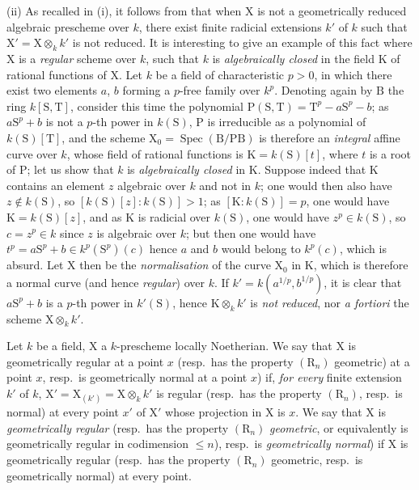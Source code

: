 \begin{remarks}[6.7.5]
(ii) As recalled in (i), it follows from  that when $\mathrm{X}$ is not a geometrically reduced algebraic prescheme over $k$, there exist finite radicial extensions $k'$ of $k$ such that $\mathrm{X}'=\mathrm{X}\otimes_k k'$ is not reduced. It is interesting to give an example of this fact where $\mathrm{X}$ is a \emph{regular} scheme over $k$, such that $k$ is \emph{algebraically closed} in the field $\mathrm{K}$ of rational functions of $\mathrm{X}$. Let $k$ be a field of characteristic $p>0$, in which there exist two elements $a$, $b$ forming a $p$-free family over $k^p$. Denoting again by $\mathrm{B}$ the ring $k[\mathrm{S},\mathrm{T}]$, consider this time the polynomial $\mathrm{P}(\mathrm{S},\mathrm{T})=\mathrm{T}^p-a\mathrm{S}^p-b$; as $a\mathrm{S}^p+b$ is not a $p$-th power in $k(\mathrm{S})$, $\mathrm{P}$ is irreducible as a polynomial of $k(\mathrm{S})[\mathrm{T}]$, and the scheme $\mathrm{X}_0=\operatorname{Spec}(\mathrm{B}/\mathrm{PB})$ is therefore an \emph{integral} affine curve over $k$, whose field of rational functions is $\mathrm{K}=k(\mathrm{S})[t]$, where $t$ is a root of $\mathrm{P}$; let us show that $k$ is \emph{algebraically closed} in $\mathrm{K}$. Suppose indeed that $\mathrm{K}$ contains an element $z$ algebraic over $k$ and not in $k$; one would then also have $z\notin k(\mathrm{S})$, so $[k(\mathrm{S})[z]:k(\mathrm{S})]>1$; as $[\mathrm{K}:k(\mathrm{S})]=p$, one would have $\mathrm{K}=k(\mathrm{S})[z]$, and as $\mathrm{K}$ is radicial over $k(\mathrm{S})$, one would have $z^p\in k(\mathrm{S})$, so $c=z^p\in k$ since $z$ is algebraic over $k$; but then one would have $t^p=a\mathrm{S}^p+b\in k^p(\mathrm{S}^p)(c)$ hence $a$ and $b$ would belong to $k^p(c)$, which is absurd. Let $\mathrm{X}$ then be the \emph{normalisation} of the curve $\mathrm{X}_0$ in $\mathrm{K}$, which is therefore a normal curve (and hence \emph{regular}) over $k$. If $k'=k(a^{1/p},b^{1/p})$, it is clear that $a\mathrm{S}^p+b$ is a $p$-th power in $k'(\mathrm{S})$, hence $\mathrm{K}\otimes_k k'$ is \emph{not reduced}, nor \emph{a fortiori} the scheme $\mathrm{X}\otimes_k k'$.
\end{remarks}

\begin{definition}[6.7.6]
\label{IV.6.7.6}
Let $k$ be a field, $\mathrm{X}$ a $k$-prescheme locally Noetherian. We say that $\mathrm{X}$ is \textup{geometrically regular at a point $x$ (resp.\ has the property $(\mathrm{R}_n)$ geometric) at a point $x$, resp.\ is geometrically normal at a point $x$)} if, \emph{for every} finite extension $k'$ of $k$, $\mathrm{X}'=\mathrm{X}_{(k')}=\mathrm{X}\otimes_k k'$ is regular \textup{(resp.}\ has the property $(\mathrm{R}_n)$\textup{, resp.}\ is normal) at every point $x'$ of $\mathrm{X}'$ whose projection in $\mathrm{X}$ is $x$. We say that $\mathrm{X}$ is \emph{geometrically regular} \textup{(resp.}\ has the property $(\mathrm{R}_n)$ \emph{geometric}, \textup{or equivalently} is geometrically regular in codimension $\leqslant n$)\textup{, resp.}\ is \emph{geometrically normal}) if $\mathrm{X}$ is geometrically regular \textup{(resp.}\ has the property $(\mathrm{R}_n)$ geometric\textup{, resp.}\ is geometrically normal) at every point.
\end{definition}

